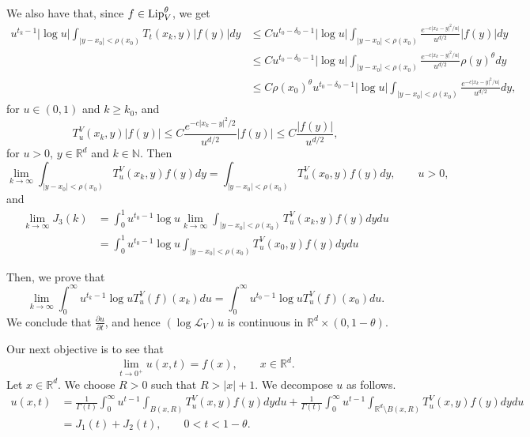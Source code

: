\documentclass[10pt, a4paper, reqno]{amsart}
\theoremstyle{definition}
\theoremstyle{remark}
\newcommand{\RR}{\mathbb{R}}
\newcommand{\NN}{\mathbb{N}}
\newcommand{\Lip}{\textup{Lip}}
\numberwithin{equation}{section}
\begin{document}
We also have that, since $f\in \Lip_V^\theta$, we get
\begin{equation*}
    \begin{split}
        u^{t_k-1} |\log u | \int_{|y-x_0|<\rho(x_0)} T_t(x_k,y) |f(y)| dy & \leq C u^{t_0 - {\delta_0} - 1} |\log u| \int_{|y-x_0|<\rho(x_0)} \frac{e^{-c|x_k-y|^2/u|}}{u^{d/2}} |f(y)| dy 
        \\ & \leq C u^{t_0 - {\delta_0} - 1} |\log u| \int_{|y-x_0|<\rho(x_0)} \frac{e^{-c|x_k-y|^2/u|}}{u^{d/2}} \rho(y)^\theta dy
        \\ & \leq C \rho(x_0)^\theta  u^{t_0 - {\delta_0} - 1} |\log u| \int_{|y-x_0|<\rho(x_0)} \frac{e^{-c|x_k-y|^2/u|}}{u^{d/2}} dy,
    \end{split}
\end{equation*}
for $u\in (0,1)$ and $k\geq k_0$, and 
\[ T_u^V(x_k,y) |f(y)|  \leq C \frac{e^{-c|x_k-y|^2/2}}{u^{d/2}}|f(y)| \leq C\frac{|f(y)|}{u^{d/2}},\]
for $u>0$, $y\in \RR^d$ and $k\in \NN$.
Then
\[\lim_{k\rightarrow \infty } \int_{|y-x_0|<\rho(x_0)} T_u^V(x_k,y) f(y) dy = \int_{|y-x_0|<\rho(x_0)} T_u^V(x_0,y) f(y) dy, \qquad u>0,\]
and
\[
\begin{split}
\lim_{k\rightarrow \infty } J_3(k) & = \int_0^1 u^{t_0-1} \log u \lim_{k\rightarrow \infty }  \int_{|y-x_0|<\rho(x_0)} T_u^V(x_k,y) f(y) dy du
\\ & = \int_0^1 u^{t_0-1} \log u  \int_{|y-x_0|<\rho(x_0)} T_u^V(x_0,y) f(y) dy du
\end{split}
\]

Then, we prove that 
\[\lim_{k\rightarrow\infty} \int_0^\infty u^{t_k-1} \log u   T_u^V(f)(x_k) du = \int_0^\infty u^{t_0-1} \log u   T_u^V(f)(x_0) du.\]
We conclude that $\frac{\partial u}{\partial t}$, and hence $(\log \mathcal{L}_V)u$ is continuous in $\RR^d\times (0,1-\theta)$.


Our next objective is to see that
\begin{equation}\label{eq: 3.12}
\lim_{t\rightarrow 0^+} u(x,t) = f(x), \qquad x\in \RR^d.    
\end{equation}
Let $x\in \RR^d$. We choose $R>0$ such that $R>|x|+1$. We decompose $u$ as follows.
\begin{equation*}
    \begin{split}
        u(x,t) & = \frac{1}{\Gamma(t)} \int_0^\infty u^{t-1} \int_{B(x,R)} T_u^V(x,y) f(y) dy du + \frac{1}{\Gamma(t)} \int_0^\infty u^{t-1} \int_{\RR^d\setminus B(x,R)} T_u^V(x,y) f(y) dy du
        \\ & = J_1(t) + J_2(t), \qquad 0<t<1-\theta.
    \end{split}
\end{equation*}
\end{document}
